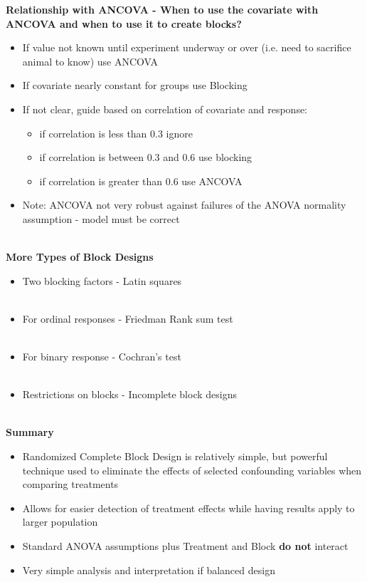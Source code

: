 \textbf{Relationship with ANCOVA - When to use the covariate with ANCOVA and when to use it to create blocks?}
    \begin{itemize}
        \item{If value not known until experiment underway or over (i.e. need to sacrifice animal to know) use ANCOVA}
        \item{If covariate nearly constant for groups use Blocking}
        \item{If not clear, guide based on correlation of covariate and response:}
        \begin{itemize}
        	\item{if correlation is less than 0.3 ignore}
        	\item{if correlation is between 0.3 and 0.6 use blocking}
        	\item{if correlation is greater than 0.6 use ANCOVA}
        \end{itemize}
        \item{Note: ANCOVA not very robust against failures of the ANOVA normality assumption - model must be correct}\\
    \end{itemize}
~\\
 \textbf{More Types of Block Designs}
    \begin{itemize}
        \item{Two blocking factors - Latin squares}\\~\\
        \item{For ordinal responses - Friedman Rank sum test}\\~\\
        \item{For binary response - Cochran's test}\\~\\
        \item{Restrictions on blocks - Incomplete block designs}\\~\\
    \end{itemize}

\textbf{Summary}
  \begin{itemize}
        \item{Randomized Complete Block Design is relatively simple, but powerful technique used to eliminate the effects of selected confounding variables when comparing treatments}
        \item{Allows for easier detection of treatment effects while having results apply to larger population}
        \item{Standard ANOVA assumptions plus Treatment and Block \textbf{do not} interact}
        \item{Very simple analysis and interpretation if balanced design}
\end{itemize}
